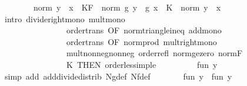 \begin{isabellebody}
\ \ \ \ \ \ \ \ norm\ {\isacharparenleft}{\kern0pt}y\ {\isacharminus}{\kern0pt}\ x{\isacharparenright}{\kern0pt}\ {\isacharasterisk}{\kern0pt}\ KF\ {\isacharasterisk}{\kern0pt}\ norm\ {\isacharparenleft}{\kern0pt}g\ y\ {\isacharminus}{\kern0pt}\ g\ x{\isacharparenright}{\kern0pt}\ {\isacharasterisk}{\kern0pt}\ K{\isacharparenright}{\kern0pt}\ {\isacharslash}{\kern0pt}\ norm\ {\isacharparenleft}{\kern0pt}y\ {\isacharminus}{\kern0pt}\ x{\isacharparenright}{\kern0pt}{\isachardoublequoteclose}\isanewline
\ \ \ \ \ \ \isamarkupfalse%
\ {\isacharparenleft}{\kern0pt}intro\ divide{\isacharunderscore}{\kern0pt}right{\isacharunderscore}{\kern0pt}mono\ mult{\isacharunderscore}{\kern0pt}mono{\isacharprime}{\kern0pt}\isanewline
\ \ \ \ \ \ \ \ \ \ \ \ \ \ \ \ order{\isacharunderscore}{\kern0pt}trans\ {\isacharbrackleft}{\kern0pt}OF\ norm{\isacharunderscore}{\kern0pt}triangle{\isacharunderscore}{\kern0pt}ineq\ add{\isacharunderscore}{\kern0pt}mono{\isacharbrackright}{\kern0pt}\isanewline
\ \ \ \ \ \ \ \ \ \ \ \ \ \ \ \ order{\isacharunderscore}{\kern0pt}trans\ {\isacharbrackleft}{\kern0pt}OF\ norm{\isacharunderscore}{\kern0pt}prod\ mult{\isacharunderscore}{\kern0pt}right{\isacharunderscore}{\kern0pt}mono{\isacharbrackright}{\kern0pt}\isanewline
\ \ \ \ \ \ \ \ \ \ \ \ \ \ \ \ mult{\isacharunderscore}{\kern0pt}nonneg{\isacharunderscore}{\kern0pt}nonneg\ order{\isacharunderscore}{\kern0pt}refl\ norm{\isacharunderscore}{\kern0pt}ge{\isacharunderscore}{\kern0pt}zero\ norm{\isacharunderscore}{\kern0pt}F\isanewline
\ \ \ \ \ \ \ \ \ \ \ \ \ \ \ \ K\ {\isacharbrackleft}{\kern0pt}THEN\ order{\isacharunderscore}{\kern0pt}less{\isacharunderscore}{\kern0pt}imp{\isacharunderscore}{\kern0pt}le{\isacharbrackright}{\kern0pt}{\isacharparenright}{\kern0pt}\isanewline
\ \ \ \ \isamarkupfalse%
\ \isamarkupfalse%
\ {\isachardoublequoteopen}{\isasymdots}\ {\isacharequal}{\kern0pt}\ {\isacharquery}{\kern0pt}fun{}\ y{\isachardoublequoteclose}\isanewline
\ \ \ \ \ \ \isamarkupfalse%
\ {\isacharparenleft}{\kern0pt}simp\ add{\isacharcolon}{\kern0pt}\ add{\isacharunderscore}{\kern0pt}divide{\isacharunderscore}{\kern0pt}distrib\ Ng{\isacharunderscore}{\kern0pt}def\ Nf{\isacharunderscore}{\kern0pt}def{\isacharparenright}{\kern0pt}\isanewline
\ \ \ \ \isamarkupfalse%
\ \isamarkupfalse%
\ {\isachardoublequoteopen}{\isacharquery}{\kern0pt}fun{}\ y\ {\isasymle}\ {\isacharquery}{\kern0pt}fun{}\ y{\isachardoublequoteclose}\ \isacommand{{\isachardot}{\kern0pt}}\isamarkupfalse%

\end{isabellebody}
